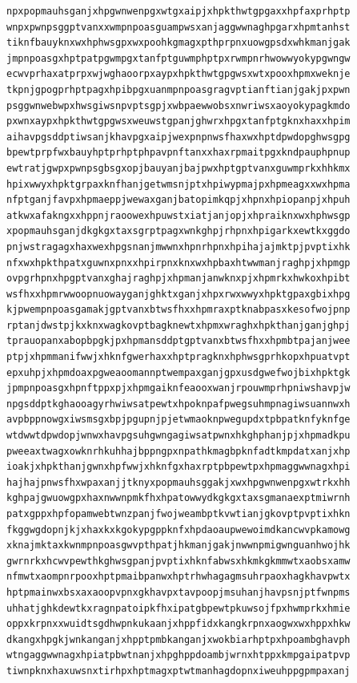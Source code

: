 \documentclass[11pt,letterpaper]{exam}
\begin{document}
\begin{questions}
\begin{verbatim}
npxpopmauhsganjxhpgwnwenpgxwtgxaipjxhpkthwtgpgaxxhpfaxprhptp
wnpxpwnpsggptvanxxwmpnpoasguampwsxanjaggwwnaghpgarxhpmtanhst
tiknfbauyknxwxhphwsgpxwxpoohkgmagxpthprpnxuowgpsdxwhkmanjgak
jmpnpoasgxhptpatpgwmpgxtanfptguwmphptpxrwmpnrhwowwyokypgwngw
ecwvprhaxatprpxwjwghaoorpxaypxhpkthwtgpgwsxwtxpooxhpmxweknje
tkpnjgpogprhptpagxhpibpgxuanmpnpoasgragvptianftianjgakjpxpwn
psggwnwebwpxhwsgiwsnpvptsgpjxwbpaewwobsxnwriwsxaoyokypagkmdo
pxwnxaypxhpkthwtgpgwsxweuwstgpanjghwrxhpgxtanfptgknxhaxxhpim
aihavpgsddptiwsanjkhavpgxaipjwexpnpnwsfhaxwxhptdpwdopghwsgpg
bpewtprpfwxbauyhptprhptphpavpnftanxxhaxrpmaitpgxkndpauphpnup
ewtratjgwpxpwnpsgbsgxopjbauyanjbajpwxhptgptvanxguwmprkxhhkmx
hpixwwyxhpktgrpaxknfhanjgetwmsnjptxhpiwypmajpxhpmeagxxwxhpma
nfptganjfavpxhpmaeppjwewaxganjbatopimkqpjxhpnxhpiopanpjxhpuh
atkwxafakngxxhppnjraoowexhpuwstxiatjanjopjxhpraiknxwxhphwsgp
xpopmauhsganjdkgkgxtaxsgrptpagxwnkghpjrhpnxhpigarkxewtkxggdo
pnjwstragagxhaxwexhpgsnanjmwwnxhpnrhpnxhpihajajmktpjpvptixhk
nfxwxhpkthpatxguwnxpnxxhpirpnxknxwxhpbaxhtwwmanjraghpjxhpmgp
ovpgrhpnxhpgptvanxghajraghpjxhpmanjanwknxpjxhpmrkxhwkoxhpibt
wsfhxxhpmrwwoopnuowayganjghktxganjxhpxrwxwwyxhpktgpaxgbixhpg
kjpwempnpoasgamakjgptvanxbtwsfhxxhpmraxptknabpasxkesofwojpnp
rptanjdwstpjkxknxwagkovptbagknewtxhpmxwraghxhpkthanjganjghpj
tprauopanxabopbpgkjpxhpmansddptgptvanxbtwsfhxxhpmbtpajanjwee
ptpjxhpmmanifwwjxhknfgwerhaxxhptpragknxhphwsgprhkopxhpuatvpt
epxuhpjxhpmdoaxpgweaoomannptwempaxganjgpxusdgwefwojbixhpktgk
jpmpnpoasgxhpnftppxpjxhpmgaiknfeaooxwanjrpouwmprhpniwshavpjw
npgsddptkghaooagyrhwiwsatpewtxhpoknpafpwegsuhmpnagiwsuannwxh
avpbppnowgxiwsmsgxbpjpgupnjpjetwmaoknpwegupdxtpbpatknfyknfge
wtdwwtdpwdopjwnwxhavpgsuhgwngagiwsatpwnxhkghphanjpjxhpmadkpu
pweeaxtwagxowknrhkuhhajbppngpxnpathkmagbpknfadtkmpdatxanjxhp
ioakjxhpkthanjgwnxhpfwwjxhknfgxhaxrptpbpewtpxhpmaggwwnagxhpi
hajhajpnwsfhxwpaxanjjtknyxpopmauhsggakjxwxhpgwnwenpgxwtrkxhh
kghpajgwuowgpxhaxnwwnpmkfhxhpatowwydkgkgxtaxsgmanaexptmiwrnh
patxgppxhpfopamwebtwnzpanjfwojweambptkvwtianjgkovptpvptixhkn
fkggwgdopnjkjxhaxkxkgokypgppknfxhpdaoaupwewoimdkancwvpkamowg
xknajmktaxkwnmpnpoasgwvpthpatjhkmanjgakjnwwnpmigwnguanhwojhk
gwrnrkxhcwvpewthkghwsgpanjpvptixhknfabwsxhkmkgkmmwtxaobsxamw
nfmwtxaompnrpooxhptpmaibpanwxhptrhwhagagmsuhrpaoxhagkhavpwtx
hptpmainwxbsxaxaoopvpnxgkhavpxtavpoopjmsuhanjhavpsnjptfwnpms
uhhatjghkdewtkxragnpatoipkfhxipatgbpewtpkuwsojfpxhwmprkxhmie
oppxkrpnxxwuidtsgdhwpnkukaanjxhppfidxkangkrpnxaogwxwxhppxhkw
dkangxhpgkjwnkanganjxhpptpmbkanganjxwokbiarhptpxhpoambghavph
wtngaggwwnagxhpiatpbwtnanjxhpghppdoambjwrnxhtppxkmpgaipatpvp
tiwnpknxhaxuwsnxtirhpxhptmagxptwtmanhagdopnxiweuhppgpmpaxanj

\end{verbatim}
\end{questions}
\end{document}
